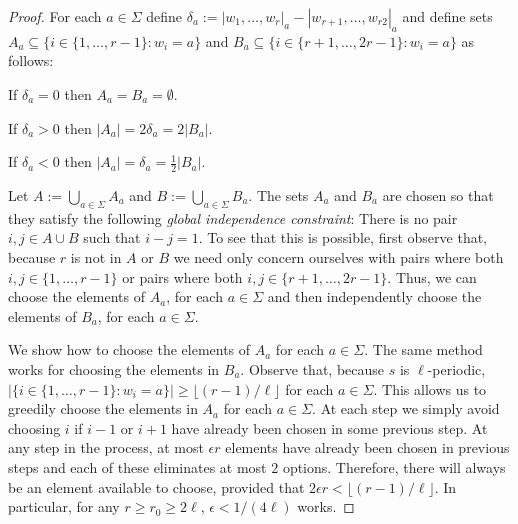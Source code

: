 \documentclass{patmorin}
\begin{document}
\begin{proof}
    For each $a\in\Sigma$ define $\delta_a := |w_1,\ldots,w_r|_{a}-|w_{r+1},\ldots,w_{r2}|_{a}$ and define sets $A_a\subseteq\{i\in \{1,\ldots,r-1\}: w_i=a\}$ and $B_a\subseteq\{i\in\{r+1,\ldots,2r-1\}:w_i=a\}$ as follows:
    \begin{compactenum}
        \item If $\delta_a=0$ then $A_a=B_a=\emptyset$.
        \item If $\delta_a>0$ then $|A_a|=2\delta_a=2|B_a|$.
        \item If $\delta_a<0$ then $|A_a|=\delta_a=\tfrac{1}{2}|B_a|$.
    \end{compactenum}
    Let $A:=\bigcup_{a\in\Sigma} A_a$ and $B:=\bigcup_{a\in\Sigma} B_a$.
    The sets $A_a$ and $B_a$ are chosen so that they satisfy the following \emph{global independence constraint}:  There is no pair $i,j\in A\cup B$ such that $i-j=1$.  To see that this is possible, first observe that, because $r$ is not in $A$ or $B$ we need only concern ourselves with pairs where both $i,j\in\{1,\ldots,r-1\}$ or pairs where both $i,j\in\{r+1,\ldots,2r-1\}$.  Thus, we can choose the elements of $A_a$, for each $a\in\Sigma$ and then independently choose the elements of $B_a$, for each $a\in\Sigma$.

    We show how to choose the elements of $A_a$ for each $a\in\Sigma$.  The same method works for choosing the elements in $B_a$. Observe that, because $s$ is $\ell$-periodic, $|\{i\in \{1,\ldots,r-1\}:w_i=a\}|\ge \lfloor(r-1)/\ell\rfloor$ for each $a\in\Sigma$.  This allows us to greedily choose the elements in $A_a$ for each $a\in\Sigma$. At each step we simply avoid choosing $i$ if $i-1$ or $i+1$ have already been chosen in some previous step.  At any step in the process, at most $\epsilon r$ elements have already been chosen in previous steps and each of these eliminates at most $2$ options.  Therefore, there will always be an element available to choose, provided that $2\epsilon r < \lfloor(r-1)/\ell\rfloor$.  In particular, for any $r\ge r_0\ge 2\ell$, $\epsilon < 1/(4\ell)$ works.


\end{proof}
\end{document}
